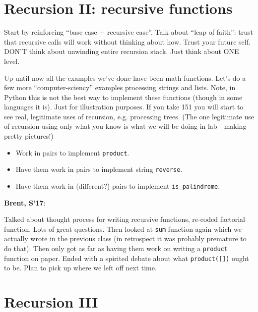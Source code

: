 \documentclass{article}
\newenvironment{reflect}[1]
{
  \noindent
  \begin{lrbox}{\reflectbox}
    \begin{minipage}[t]{\textwidth}
      \textbf{#1}:
}{
    \end{minipage}
  \end{lrbox}
  \fbox{\usebox{\reflectbox}}
}
\begin{document}


\section{Recursion II: recursive functions}

Start by reinforcing ``base case + recursive case''.  Talk about
``leap of faith'': trust that recursive calls will work without
thinking about how.  Trust your future self.  DON'T think about
unwinding entire recursion stack.  Just think about ONE level.

Up until now all the examples we've done have been math functions.
Let's do a few more ``computer-sciency'' examples processing strings
and lists.  Note, in Python this is not the best way to implement
these functions (though in some languages it is).  Just for
illustration purposes.  If you take 151 you will start to see real,
legitimate uses of recursion, e.g. processing trees.  (The one
legitimate use of recursion using only what you know is what we will
be doing in lab---making pretty pictures!)

\begin{itemize}
\item Work in pairs to implement \verb|product|.
\item Have them work in pairs to implement string \verb|reverse|.
\item Have them work in (different?) pairs to implement \verb|is_palindrome|.
\end{itemize}

\begin{reflect}{Brent, S'17}
  Talked about thought process for writing recursive functions,
  re-coded factorial function.  Lots of great questions.  Then looked
  at \texttt{sum} function again which we actually wrote in the
  previous class (in retrospect it was probably premature to do
  that).  Then only got as far as having them work on writing a
  \texttt{product} function on paper.  Ended with a spirited debate
  about what \texttt{product([])} ought to be.  Plan to pick up where
  we left off next time.
\end{reflect}

\section{Recursion III}
\end{document}
